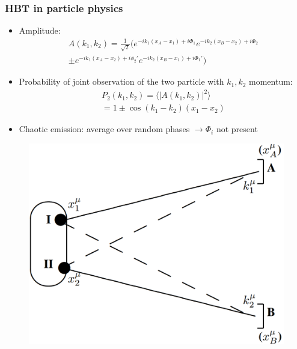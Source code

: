 \documentclass{beamer}
\begin{document}
\begin{frame}
\frametitle{HBT in particle physics}
\begin{itemize}
 \item Amplitude:
 \vspace*{-10pt}
\begin{align*}
A(k_1, k_2) =  \frac{1}{\sqrt{2}}\bigg(e^{-ik_1(x_A-x_1)+i\Phi_1}e^{-ik_2(x_B-x_2)+i\Phi_2}\\\pm e^{-ik_1(x_A-x_2)+i\phi_2'}e^{-ik_2(x_B-x_1)+i\Phi_1'}\bigg)
\end{align*}
\end{itemize}

\begin{minipage}[b]{0.49\textwidth}
\begin{itemize}
\setlength{\itemsep}{8pt}
\item Probability of joint observation of the two particle with $k_1, k_2$ momentum:
\begin{align*}
P_2(k_1, k_2) = \langle |A(k_1, k_2)|^2 \rangle \\=1\pm \cos{(k_1-k_2)(x_1-x_2)}
\end{align*}
\item Chaotic emission: average over random phases $\rightarrow \Phi_i$ not present
\end{itemize}

\end{minipage}
\begin{minipage}[b]{0.49\textwidth}
\begin{figure}
\includegraphics[scale=0.25]{pic/corr.png}
\end{figure}
\end{minipage}
\end{frame}
\end{document}
